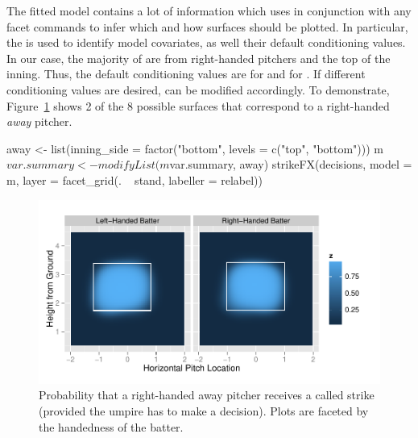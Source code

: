 \begin{article}
The fitted model  contains a lot of information which 
uses in conjunction with any  facet commands to infer
which and how surfaces should be plotted. In particular, the 
is used to identify model covariates, as well their default conditioning
values. In our case, the majority of  are from right-handed
pitchers and the top of the inning. Thus, the default conditioning
values are  for  and 
for . If different conditioning values are desired,
 can be modified accordingly. To demonstrate, Figure~\ref{fig:strike-probs}
shows 2 of the 8 possible surfaces that correspond to a right-handed
\emph{away} pitcher.
%
\begin{Schunk}
\begin{Sinput}
away <- list(inning_side = factor("bottom", levels = c("top", "bottom")))
m$var.summary <- modifyList(m$var.summary, away)
strikeFX(decisions, model = m, layer = facet_grid(. ~ stand, labeller = relabel))
\end{Sinput}
\end{Schunk}
%
\begin{figure}[h]
\centerline{\includegraphics[scale = 1]{prob-strike.pdf}}

\caption{\label{fig:strike-probs}Probability that a right-handed away pitcher
receives a called strike (provided the umpire has to make a decision).
Plots are faceted by the handedness of the batter.}
\end{figure}



\end{article}
